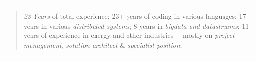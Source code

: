 \documentclass[12pt]{res} %
\begin{document}
\begin{resume}
\vspace{20pt}
\vspace{-30pt}
\begin{center}
	\rule{0.5\textwidth}{1pt}
\end{center}

\begin{quotation}
	{\large \emph{23 Years} of total experience; 23+ years of coding in various languages; 17 years in various 
	\emph{distributed systems}; 8 years in \emph{bigdata and datastreams}; 
	11 years of experience in energy and other industries ---mostly on
	\emph{project management, solution architect} \& \emph{specialist position}};
\end{quotation}
\vspace{-20pt}
\begin{center}
	\rule{0.5\textwidth}{1pt}
\end{center}
\begin{multicols}{2}

\end{multicols}
\end{resume}
\end{document}
